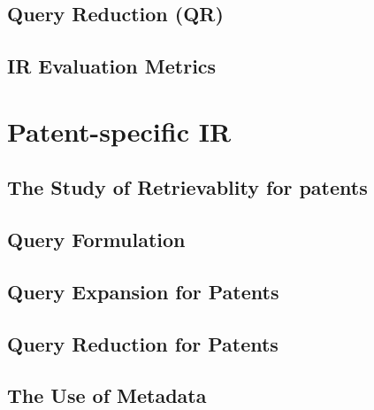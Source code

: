 \subsection{Query Reduction (QR)}
%
%

\subsection{IR Evaluation Metrics}
%


\section{Patent-specific IR}
\label{subsec:patentir}

\subsection{The Study of Retrievablity for patents}
%

\subsection{Query Formulation}
%

\subsection{Query Expansion for Patents}
%

\subsection{Query Reduction for Patents}
%

%

\subsection{The Use of Metadata}
%
\label{sec:metadata}

